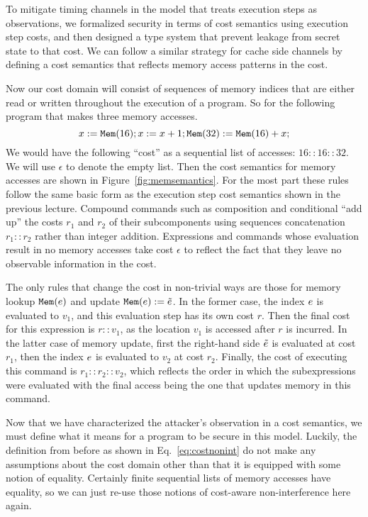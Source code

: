\documentclass[11pt,twoside]{scrartcl}
\begin{document}
To mitigate timing channels in the model that treats execution steps as observations, we formalized security in terms of cost semantics using execution step costs, and then designed a type system that prevent leakage from secret state to that cost. We can follow a similar strategy for cache side channels by defining a cost semantics that reflects memory access patterns in the cost. 

Now our cost domain will consist of sequences of memory indices that are either read or written throughout the execution of a program. So for the following program that makes three memory accesses.
\[
x := \texttt{\upshape Mem}(16); x := x + 1; \texttt{\upshape Mem}(32) := \texttt{\upshape Mem}(16) + x;
\]
We would have the following ``cost'' as a sequential list of accesses: $16 :: 16 :: 32$. We will use $\epsilon$ to denote the empty list. Then the cost semantics for memory accesses are shown in Figure~\ref{fig:memsemantics}. For the most part these rules follow the same basic form as the execution step cost semantics shown in the previous lecture. Compound commands such as composition and conditional ``add up'' the costs $r_1$ and $r_2$ of their subcomponents using sequences concatenation $r_1 :: r_2$ rather than integer addition. Expressions and commands whose evaluation result in no memory accesses take cost $\epsilon$ to reflect the fact that they leave no observable information in the cost.

The only rules that change the cost in non-trivial ways are those for memory lookup $\texttt{\upshape Mem}(e)$ and update $\texttt{\upshape Mem}(e) := \tilde{e}$. In the former case, the index $e$ is evaluated to $v_1$, and this evaluation step has its own cost $r$. Then the final cost for this expression is $r :: v_1$, as the location $v_1$ is accessed after $r$ is incurred. In the latter case of memory update, first the right-hand side $\tilde{e}$ is evaluated at cost $r_1$, then the index $e$ is evaluated to $v_2$ at cost $r_2$. Finally, the cost of executing this command is $r_1 :: r_2 :: v_2$, which reflects the order in which the subexpressions were evaluated with the final access being the one that updates memory in this command.

Now that we have characterized the attacker's observation in a cost semantics, we must define what it means for a program to be secure in this model. Luckily, the definition from before as shown in Eq.~\ref{eq:costnonint} do not make any assumptions about the cost domain other than that it is equipped with some notion of equality. Certainly finite sequential lists of memory accesses have equality, so we can just re-use those notions of cost-aware non-interference here again.
\end{document}
